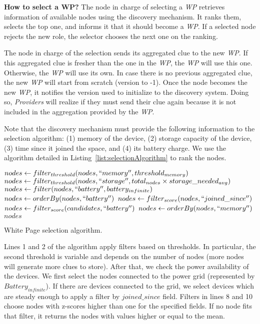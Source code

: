 \noindent\textbf{How to select a WP?}
The node in charge of selecting a \emph{WP} retrieves information of available nodes using the discovery mechanism.
It ranks them, selects the top one, and informs it that it should become a \emph{WP}.
If a selected node rejects the new role, the selector chooses the next one on the ranking.

The node in charge of the selection sends its aggregated clue to the new \emph{WP}.
If this aggregated clue is fresher than the one in the \emph{WP}, the \emph{WP} will use this one.
Otherwise, the \emph{WP} will use its own.
In case there is no previous aggregated clue, the new \emph{WP} will start from scratch (version to -1).
Once the node becomes the new \emph{WP}, it notifies the version used to initialize to the discovery system.
Doing so, \emph{Providers} will realize if they must send their clue again because it is not included in the aggregation provided by the \emph{WP}.

Note that the discovery mechanism must provide the following information to the selection algorithm:
(1) memory of the device,
(2) storage capacity of the device,
(3) time since it joined the space, and %
(4) its battery charge.
We use the algorithm detailed in Listing~\ref{list:selectionAlgorithm} to rank the nodes.

\begin{listing}
  \begin{algorithmic}[1]
  \State $nodes \gets filter_{threshold}(nodes, ``memory'', threshold_{memory})$
  \State $nodes \gets filter_{threshold}(nodes, ``storage'', total_{nodes} \times storage\_needed_{avg})$
    \State $nodes \gets filter(nodes, ``battery'', battery_{infinite})$
    \State $nodes \gets orderBy(nodes, ``battery'')$
  \Else
      \State $nodes \gets filter_{score}(nodes, ``joined\_since'')$
    \EndIf
    \State $nodes \gets filter_{score}(candidates, ``battery'')$
    \State $nodes \gets orderBy(nodes, ``memory'')$
  \EndIf
  \State \Return $nodes$
  \end{algorithmic}
  \caption{White Page selection algorithm.}
  \label{list:selectionAlgorithm}
\end{listing}

Lines 1 and 2 of the algorithm apply filters based on thresholds.
In particular, the second threshold is variable and depends on the number of nodes (more nodes will generate more clues to store).
After that, we check the power availability of the devices.
We first select the nodes connected to the power grid (represented by $Battery_{infinite}$).
If there are devices connected to the grid, we select devices which are steady enough to apply a filter by $joined\_since$ field.
Filters in lines 8 and 10 choose nodes with z-scores higher than one for the specified fields.
If no node fits that filter, it returns the nodes with values higher or equal to the mean.

